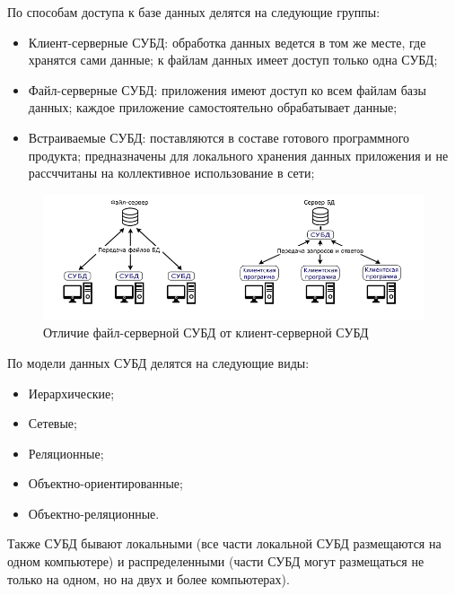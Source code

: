 По способам доступа к базе данных делятся на следующие группы:
\begin{itemize}
    \item Клиент-серверные СУБД: обработка данных ведется в том же месте, где
        хранятся сами данные; к файлам данных имеет доступ только одна СУБД;
    \item Файл-серверные СУБД: приложения имеют доступ ко всем файлам базы
        данных; каждое приложение самостоятельно обрабатывает данные;
    \item Встраиваемые СУБД: поставляются в составе готового программного
        продукта; предназначены для локального хранения данных приложения и не
        рассччитаны на коллективное использование в сети;
\end{itemize}
\begin{figure}[H]
    \centering
    \includegraphics[scale=0.55]{inc/img/file-server-subd.png}
    \caption{Отличие файл-серверной СУБД от клиент-серверной СУБД}
\end{figure}

По модели данных СУБД делятся на следующие виды:
\begin{itemize}
    \item Иерархические;
    \item Сетевые;
    \item Реляционные;
    \item Объектно-ориентированные;
    \item Объектно-реляционные.
\end{itemize}

Также СУБД бывают локальными (все части локальной СУБД размещаются на одном
компьютере) и распределенными (части СУБД могут размещаться не только на одном,
но на двух и более компьютерах).

